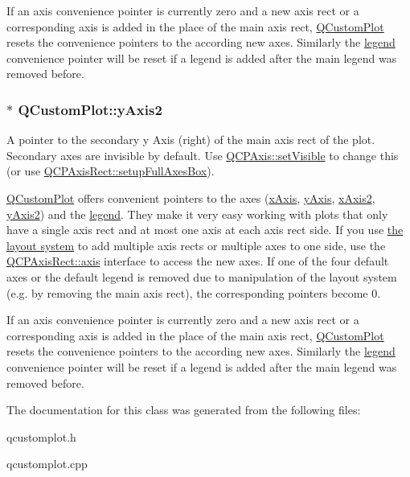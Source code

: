 If an axis convenience pointer is currently zero and a new axis rect or a corresponding axis is added in the place of the main axis rect, \hyperlink{classQCustomPlot}{Q\+Custom\+Plot} resets the convenience pointers to the according new axes. Similarly the \hyperlink{classQCustomPlot_a4eadcd237dc6a09938b68b16877fa6af}{legend} convenience pointer will be reset if a legend is added after the main legend was removed before. 
\subsubsection[{\texorpdfstring{y\+Axis2}{yAxis2}}]{ $\ast$ Q\+Custom\+Plot\+::y\+Axis2}\hypertarget{classQCustomPlot_af13fdc5bce7d0fabd640f13ba805c0b7}{}\label{classQCustomPlot_af13fdc5bce7d0fabd640f13ba805c0b7}
A pointer to the secondary y Axis (right) of the main axis rect of the plot. Secondary axes are invisible by default. Use \hyperlink{classQCPLayerable_a3bed99ddc396b48ce3ebfdc0418744f8}{Q\+C\+P\+Axis\+::set\+Visible} to change this (or use \hyperlink{classQCPAxisRect_a5fa906175447b14206954f77fc7f1ef4}{Q\+C\+P\+Axis\+Rect\+::setup\+Full\+Axes\+Box}).

\hyperlink{classQCustomPlot}{Q\+Custom\+Plot} offers convenient pointers to the axes (\hyperlink{classQCustomPlot_a9a79cd0158a4c7f30cbc702f0fd800e4}{x\+Axis}, \hyperlink{classQCustomPlot_af6fea5679725b152c14facd920b19367}{y\+Axis}, \hyperlink{classQCustomPlot_ada41599f22cad901c030f3dcbdd82fd9}{x\+Axis2}, \hyperlink{classQCustomPlot_af13fdc5bce7d0fabd640f13ba805c0b7}{y\+Axis2}) and the \hyperlink{classQCustomPlot_a4eadcd237dc6a09938b68b16877fa6af}{legend}. They make it very easy working with plots that only have a single axis rect and at most one axis at each axis rect side. If you use \hyperlink{}{the layout system} to add multiple axis rects or multiple axes to one side, use the \hyperlink{classQCPAxisRect_a560de44e47a4af0f86c59102a094b1e4}{Q\+C\+P\+Axis\+Rect\+::axis} interface to access the new axes. If one of the four default axes or the default legend is removed due to manipulation of the layout system (e.\+g. by removing the main axis rect), the corresponding pointers become 0.

If an axis convenience pointer is currently zero and a new axis rect or a corresponding axis is added in the place of the main axis rect, \hyperlink{classQCustomPlot}{Q\+Custom\+Plot} resets the convenience pointers to the according new axes. Similarly the \hyperlink{classQCustomPlot_a4eadcd237dc6a09938b68b16877fa6af}{legend} convenience pointer will be reset if a legend is added after the main legend was removed before. 

The documentation for this class was generated from the following files\+:\begin{DoxyCompactItemize}
\item 
qcustomplot.\+h\item 
qcustomplot.\+cpp\end{DoxyCompactItemize}
